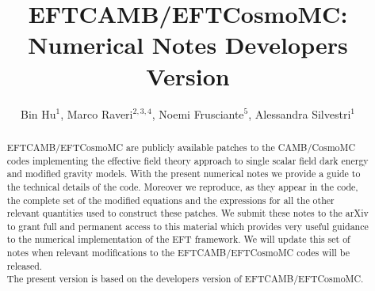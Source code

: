 \documentclass[prd,nofootinbib,showpacs]{revtex4}
\begin{document}
\title{EFTCAMB/EFTCosmoMC: Numerical Notes Developers Version}
%
\author{Bin Hu$^{1}$, Marco Raveri$^{2,3,4}$, Noemi Frusciante$^{5}$, Alessandra Silvestri$^{1}$}
%
\smallskip
{}

\begin{abstract}
EFTCAMB/EFTCosmoMC are publicly available patches to the CAMB/CosmoMC codes implementing the effective field theory approach to single scalar field dark energy and modified gravity models. With the present numerical notes we provide a guide to the technical details of the code. Moreover we reproduce, as they appear in the code, the complete set of the modified equations and the expressions for all the other relevant quantities used to construct these patches. We submit these notes to the arXiv to grant full and permanent access to this material which provides very useful guidance to the numerical implementation of the EFT framework. We will update this set of notes when relevant modifications to the EFTCAMB/EFTCosmoMC codes will be released. \\
The present version is based on the developers version of EFTCAMB/EFTCosmoMC.
\end{abstract}
\end{document}
